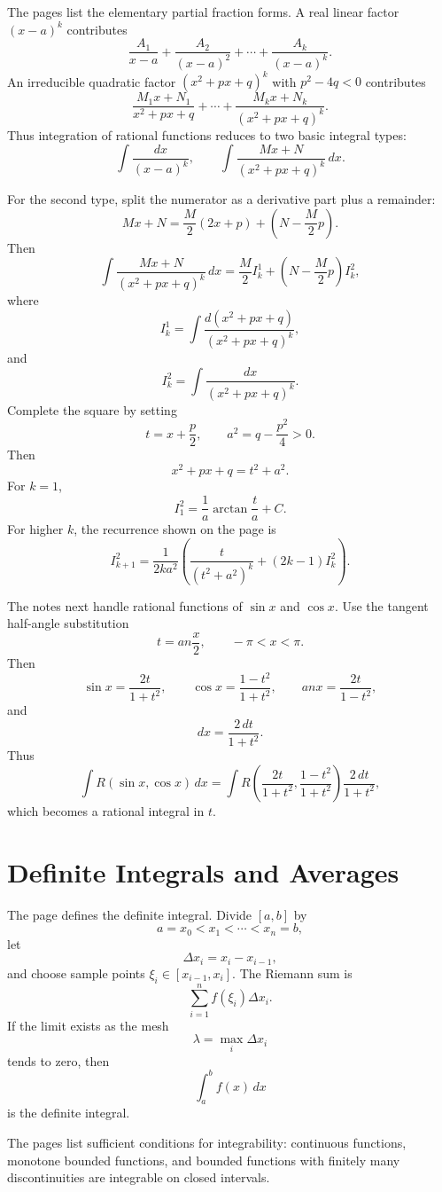 The pages list the elementary partial fraction forms.  A real linear factor $(x-a)^k$ contributes
\[
\frac{A_1}{x-a}+
\frac{A_2}{(x-a)^2}+\cdots+
\frac{A_k}{(x-a)^k}.
\]
An irreducible quadratic factor $(x^2+px+q)^k$ with $p^2-4q<0$ contributes
\[
\frac{M_1x+N_1}{x^2+px+q}
  +\cdots+
\frac{M_kx+N_k}{(x^2+px+q)^k}.
\]
Thus integration of rational functions reduces to two basic integral types:
\[
  \int
\frac{dx}{(x-a)^k},
  \qquad
  \int
\frac{Mx+N}{(x^2+px+q)^k}\,dx.
\]

For the second type, split the numerator as a derivative part plus a remainder:
\[
  Mx+N=
\frac M2(2x+p)+\left(N-
\frac M2p
\right).
\]
Then
\[
  \int
\frac{Mx+N}{(x^2+px+q)^k}\,dx
  =
\frac M2 I_k^1+\left(N-
\frac M2p
\right)I_k^2,
\]
where
\[
  I_k^1=\int
\frac{d(x^2+px+q)}{(x^2+px+q)^k},
\]
and
\[
  I_k^2=\int
\frac{dx}{(x^2+px+q)^k}.
\]
Complete the square by setting
\[
  t=x+
\frac p2,\qquad
  a^2=q-
\frac{p^2}{4}>0.
\]
Then
\[
  x^2+px+q=t^2+a^2.
\]
For $k=1$,
\[
  I_1^2=
\frac1a\arctan
\frac ta+C.
\]
For higher $k$, the recurrence shown on the page is
\[
  I_{k+1}^2=
\frac1{2ka^2}
  \left(
\frac{t}{(t^2+a^2)^k}+(2k-1)I_k^2
\right).
\]

The notes next handle rational functions of $\sin x$ and $\cos x$.  Use the tangent half-angle substitution
\[
  t=	an
\frac x2,\qquad -\pi<x<\pi.
\]
Then
\[
  \sin x=
\frac{2t}{1+t^2},\qquad
  \cos x=
\frac{1-t^2}{1+t^2},\qquad
  	an x=
\frac{2t}{1-t^2},
\]
and
\[
  dx=
\frac{2\,dt}{1+t^2}.
\]
Thus
\[
  \int R(\sin x,\cos x)\,dx
  =
  \int R\left(
\frac{2t}{1+t^2},
\frac{1-t^2}{1+t^2}
\right)
\frac{2\,dt}{1+t^2},
\]
which becomes a rational integral in $t$.

\section{Definite Integrals and Averages}

The page defines the definite integral.  Divide $[a,b]$ by
\[
  a=x_0<x_1<\cdots<x_n=b,
\]
let
\[
  \Delta x_i=x_i-x_{i-1},
\]
and choose sample points $\xi_i\in[x_{i-1},x_i]$.  The Riemann sum is
\[
  \sum_{i=1}^n f(\xi_i)\Delta x_i.
\]
If the limit exists as the mesh
\[
  \lambda=\max_i\Delta x_i
\]
tends to zero, then
\[
  \int_a^b f(x)\,dx
\]
is the definite integral.

The pages list sufficient conditions for integrability: continuous functions, monotone bounded functions, and bounded functions with finitely many discontinuities are integrable on closed intervals.

